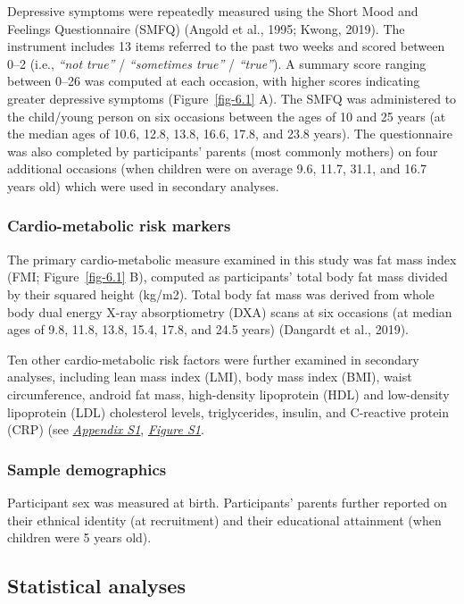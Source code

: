 \documentclass[
  letterpaper,
  DIV=11,
  numbers=noendperiod]{scrreport}
\begin{document}
Depressive symptoms were repeatedly measured using the Short Mood and
Feelings Questionnaire (SMFQ) (Angold et al., 1995; Kwong, 2019). The
instrument includes 13 items referred to the past two weeks and scored
between 0--2 (i.e., \emph{``not true''} / \emph{``sometimes true''} /
\emph{``true''}). A summary score ranging between 0--26 was computed at
each occasion, with higher scores indicating greater depressive symptoms
(Figure~\ref{fig-6.1} A). The SMFQ was administered to the child/young
person on six occasions between the ages of 10 and 25 years (at the
median ages of 10.6, 12.8, 13.8, 16.6, 17.8, and 23.8 years). The
questionnaire was also completed by participants' parents (most commonly
mothers) on four additional occasions (when children were on average
9.6, 11.7, 31.1, and 16.7 years old) which were used in secondary
analyses.

\subsubsection{Cardio-metabolic risk
markers}\label{cardio-metabolic-risk-markers}

The primary cardio-metabolic measure examined in this study was fat mass
index (FMI; Figure~\ref{fig-6.1} B), computed as participants' total
body fat mass divided by their squared height (kg/m2). Total body fat
mass was derived from whole body dual energy X-ray absorptiometry (DXA)
scans at six occasions (at median ages of 9.8, 11.8, 13.8, 15.4, 17.8,
and 24.5 years) (Dangardt et al., 2019).

Ten other cardio-metabolic risk factors were further examined in
secondary analyses, including lean mass index (LMI), body mass index
(BMI), waist circumference, android fat mass, high-density lipoprotein
(HDL) and low-density lipoprotein (LDL) cholesterol levels,
triglycerides, insulin, and C-reactive protein (CRP) (see
\href{https://osf.io/wyzd8}{\emph{Appendix S1}},
\href{https://osf.io/wyzd8}{\emph{Figure S1}}.

\subsubsection{Sample demographics}\label{sample-demographics}

Participant sex was measured at birth. Participants' parents further
reported on their ethnical identity (at recruitment) and their
educational attainment (when children were 5 years old).

\subsection{Statistical analyses}\label{statistical-analyses}
\end{document}
